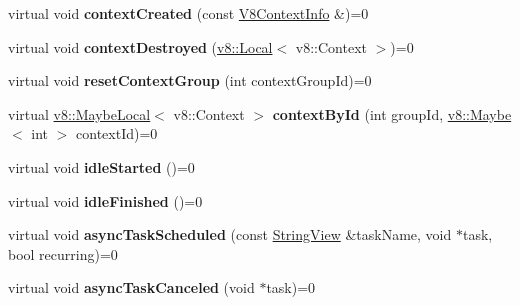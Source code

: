 \begin{DoxyCompactItemize}
\item 
\mbox{\label{classv8__inspector_1_1V8Inspector_a2027babae023eb7745a699de30ef2040}} 
virtual void {\bfseries context\+Created} (const \mbox{\hyperlink{classv8__inspector_1_1V8ContextInfo}{V8\+Context\+Info}} \&)=0
\item 
\mbox{\label{classv8__inspector_1_1V8Inspector_a519c21ce7d4693e27c0b2859f3c5901d}} 
virtual void {\bfseries context\+Destroyed} (\mbox{\hyperlink{classv8_1_1Local}{v8\+::\+Local}}$<$ v8\+::\+Context $>$)=0
\item 
\mbox{\label{classv8__inspector_1_1V8Inspector_ab65e4ca3316c60644bfdefc52a769d99}} 
virtual void {\bfseries reset\+Context\+Group} (int context\+Group\+Id)=0
\item 
\mbox{\label{classv8__inspector_1_1V8Inspector_a79545a28609e5370dec7e244e7abc39f}} 
virtual \mbox{\hyperlink{classv8_1_1MaybeLocal}{v8\+::\+Maybe\+Local}}$<$ v8\+::\+Context $>$ {\bfseries context\+By\+Id} (int group\+Id, \mbox{\hyperlink{classv8_1_1Maybe}{v8\+::\+Maybe}}$<$ int $>$ context\+Id)=0
\item 
\mbox{\label{classv8__inspector_1_1V8Inspector_a923d7681b39db723a43b279a7429d9ea}} 
virtual void {\bfseries idle\+Started} ()=0
\item 
\mbox{\label{classv8__inspector_1_1V8Inspector_a679251f1e8f90799c45dde8a86c73a80}} 
virtual void {\bfseries idle\+Finished} ()=0
\item 
\mbox{\label{classv8__inspector_1_1V8Inspector_ab9d050ddc357b771b932af978e52aff3}} 
virtual void {\bfseries async\+Task\+Scheduled} (const \mbox{\hyperlink{classv8__inspector_1_1StringView}{String\+View}} \&task\+Name, void $\ast$task, bool recurring)=0
\item 
\mbox{\label{classv8__inspector_1_1V8Inspector_ad443be8234a20744558250b92451fc9d}} 
virtual void {\bfseries async\+Task\+Canceled} (void $\ast$task)=0

\end{DoxyCompactItemize}
